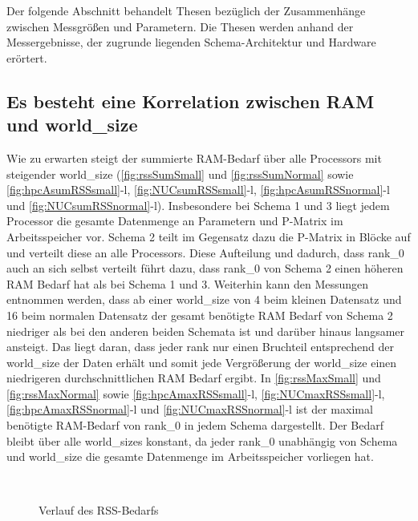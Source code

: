 Der folgende Abschnitt behandelt Thesen bezüglich der Zusammenhänge zwischen Messgrößen und Parametern. Die Thesen werden anhand der Messergebnisse, der zugrunde liegenden Schema-Architektur und Hardware erörtert.

\subsection{Es besteht eine Korrelation zwischen RAM und world\_size}

Wie zu erwarten steigt der summierte RAM-Bedarf über alle Processors mit steigender world\_size
(\autoref{fig:rssSumSmall} und \autoref{fig:rssSumNormal} sowie \autoref{fig:hpcAsumRSSsmall}-l, \autoref{fig:NUCsumRSSsmall}-l, \autoref{fig:hpcAsumRSSnormal}-l und \autoref{fig:NUCsumRSSnormal}-l). Insbesondere bei Schema 1 und 3 liegt jedem Processor die gesamte Datenmenge an Parametern und P-Matrix im Arbeitsspeicher vor. Schema 2 teilt im Gegensatz dazu die P-Matrix in Blöcke auf und verteilt diese an alle Processors. Diese Aufteilung und dadurch, dass rank\_0 auch an sich selbst verteilt führt dazu, dass rank\_0 von Schema 2 einen höheren RAM Bedarf hat als bei Schema 1 und 3. Weiterhin kann den Messungen entnommen werden,
dass ab einer world\_size von 4 beim kleinen Datensatz und 16 beim normalen Datensatz der gesamt benötigte RAM Bedarf von Schema 2 niedriger als bei den anderen beiden Schemata ist und darüber hinaus langsamer ansteigt. Das liegt daran, dass jeder rank nur einen Bruchteil entsprechend der world\_size der Daten erhält und somit jede Vergrößerung der world\_size einen niedrigeren durchschnittlichen RAM Bedarf ergibt. In \autoref{fig:rssMaxSmall} und \autoref{fig:rssMaxNormal} sowie \autoref{fig:hpcAmaxRSSsmall}-l, \autoref{fig:NUCmaxRSSsmall}-l, \autoref{fig:hpcAmaxRSSnormal}-l und \autoref{fig:NUCmaxRSSnormal}-l ist der maximal benötigte RAM-Bedarf von rank\_0 in jedem Schema dargestellt. Der Bedarf bleibt über alle world\_sizes konstant, da jeder rank\_0 unabhängig von Schema und world\_size die gesamte Datenmenge im Arbeitsspeicher vorliegen hat.

\begin{figure}[h]
    \\
    \caption{Verlauf des RSS-Bedarfs}
    \label{fig:NumberMeasurements}
\end{figure}


